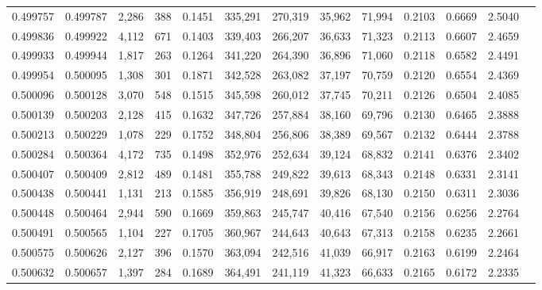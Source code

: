 \begin{tabular}{rrrrrrrrrrrrr}
0.499757 & 0.499787 &  2,286 &   388 &                                     0.1451 & 335,291 & 270,319 &  35,962 &  71,994 & 0.2103 & 0.6669 & 2.5040 \\
0.499836 & 0.499922 &  4,112 &   671 &                                     0.1403 & 339,403 & 266,207 &  36,633 &  71,323 & 0.2113 & 0.6607 & 2.4659 \\
0.499933 & 0.499944 &  1,817 &   263 &                                     0.1264 & 341,220 & 264,390 &  36,896 &  71,060 & 0.2118 & 0.6582 & 2.4491 \\
0.499954 & 0.500095 &  1,308 &   301 &                                     0.1871 & 342,528 & 263,082 &  37,197 &  70,759 & 0.2120 & 0.6554 & 2.4369 \\
0.500096 & 0.500128 &  3,070 &   548 &                                     0.1515 & 345,598 & 260,012 &  37,745 &  70,211 & 0.2126 & 0.6504 & 2.4085 \\
0.500139 & 0.500203 &  2,128 &   415 &                                     0.1632 & 347,726 & 257,884 &  38,160 &  69,796 & 0.2130 & 0.6465 & 2.3888 \\
0.500213 & 0.500229 &  1,078 &   229 &                                     0.1752 & 348,804 & 256,806 &  38,389 &  69,567 & 0.2132 & 0.6444 & 2.3788 \\
0.500284 & 0.500364 &  4,172 &   735 &                                     0.1498 & 352,976 & 252,634 &  39,124 &  68,832 & 0.2141 & 0.6376 & 2.3402 \\
0.500407 & 0.500409 &  2,812 &   489 &                                     0.1481 & 355,788 & 249,822 &  39,613 &  68,343 & 0.2148 & 0.6331 & 2.3141 \\
0.500438 & 0.500441 &  1,131 &   213 &                                     0.1585 & 356,919 & 248,691 &  39,826 &  68,130 & 0.2150 & 0.6311 & 2.3036 \\
0.500448 & 0.500464 &  2,944 &   590 &                                     0.1669 & 359,863 & 245,747 &  40,416 &  67,540 & 0.2156 & 0.6256 & 2.2764 \\
0.500491 & 0.500565 &  1,104 &   227 &                                     0.1705 & 360,967 & 244,643 &  40,643 &  67,313 & 0.2158 & 0.6235 & 2.2661 \\
0.500575 & 0.500626 &  2,127 &   396 &                                     0.1570 & 363,094 & 242,516 &  41,039 &  66,917 & 0.2163 & 0.6199 & 2.2464 \\
0.500632 & 0.500657 &  1,397 &   284 &                                     0.1689 & 364,491 & 241,119 &  41,323 &  66,633 & 0.2165 & 0.6172 & 2.2335 \\

\end{tabular}
